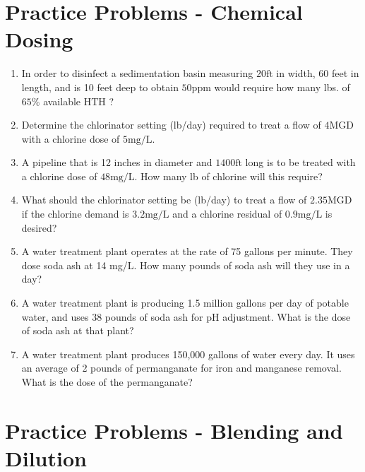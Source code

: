 \section*{Practice Problems - Chemical Dosing}
\begin{enumerate}

\item In order to disinfect a sedimentation basin measuring $20 \mathrm{ft}$ in width, 60 feet in length, and is 10 feet deep to obtain $50 \mathrm{ppm}$ would require how many lbs. of $65 \%$ available $\mathrm{HTH}$ ?\\

\item Determine the chlorinator setting (lb/day) required to treat a flow of $4 \mathrm{MGD}$ with a chlorine dose of $5 \mathrm{mg} / \mathrm{L}$.

\item A pipeline that is 12 inches in diameter and $1400 \mathrm{ft}$ long is to be treated with a chlorine dose of $48 \mathrm{mg} / \mathrm{L}$. How many lb of chlorine will this require?

\item What should the chlorinator setting be (lb/day) to treat a flow of $2.35 \mathrm{MGD}$ if the chlorine demand is $3.2 \mathrm{mg} / \mathrm{L}$ and a chlorine residual of $0.9 \mathrm{mg} / \mathrm{L}$ is desired?

\item A water treatment plant operates at the rate of 75 gallons per minute. They dose soda ash at 14 mg/L. How many pounds of soda ash will they use in a day?

\item A water treatment plant is producing 1.5 million gallons per day of potable water, and uses 38 pounds of soda ash for pH adjustment. What is the dose of soda ash at that plant?

\item A water treatment plant produces 150,000 gallons of water every day. It uses an
average of 2 pounds of permanganate for iron and manganese removal. What is the dose of the
permanganate? 


\end{enumerate}


\section*{Practice Problems - Blending and Dilution}

